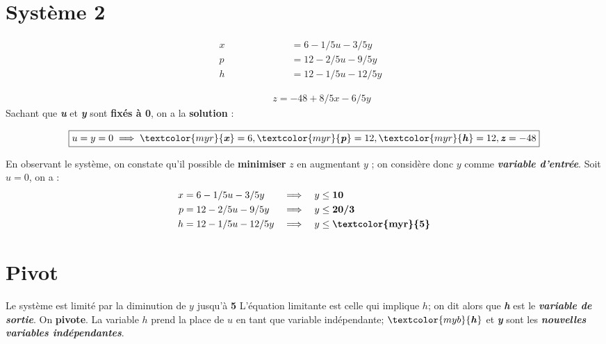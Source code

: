 \documentclass{report}
\newcommand{\Pointilles}[1]{%
  \par\nobreak
  \noindent\rule{0pt}{1.5\baselineskip}%
  \multido{}{#1}{\noindent\makebox[\linewidth]{\dotfill}\endgraf}%
  \bigskip%
}
\begin{document}
\begin{multicols*}{3}
\section{Système 2}
\begin{align*}
    x \quad\quad\quad\quad\quad\quad &= 6 - 1/5u -3/5y& \\
    p \quad\quad\quad\quad  &= 12 -2/5u -9/5y& \\
    h \quad\quad &= 12 - 1/5u -12/5y&
\end{align*}
\vspace{-2.5em}    
\Pointilles{1}
\vspace{-2.5em}
\begin{align*}
    \quad\quad\quad\;\; z = -48 +8/5x -6/5y
\end{align*}
Sachant que 
\textcolor{myb}{\textbf{\textit{u}}} et 
\textcolor{myb}{\textbf{\textit{y}}}  sont \textbf{fixés à 0}, 
on a la \textbf{solution} : 

\begin{align*}
\boxed{u = y = 0 \implies 
\textcolor{myr}{\textbf{\textit{x}}}  = 6, 
\textcolor{myr}{\textbf{\textit{p}}} = 12,
\textcolor{myr}{\textbf{\textit{h}}} = 12,
\textbf{\textit{z}} = -48}
\end{align*}

En observant le système, on constate qu'il possible de 
\textbf{minimiser} $z$ en augmentant $y$ ; on considère 
donc $y$ comme \textcolor{myb}{\textbf{\textit{variable d'entrée}}}. Soit 
$u = 0$, on a :
\begin{align*}
    x &= 6 - 1/5u -3/5y& 
    \implies \quad 
    & y \leq \textbf{10}  
    \\
    p &= 12 - 2/5u -9/5y 
      & \implies \quad  &  y \leq \textbf{20/3}
    \\
    h &= 12 - 1/5u -12/5y&
    \implies \quad & y \leq \textbf{\textcolor{myr}{5}} 
\end{align*}

\section{Pivot}
Le système est limité par la diminution de $y$ jusqu'à \textcolor{myr}{\textbf{5}} 
L'équation limitante est celle qui implique $h$; on dit alors que 
\textcolor{myr}{\textbf{\textit{h}}} est le 
\textcolor{myr}{\textbf{\textit{variable de sortie}}}. On 
\textbf{pivote}. La variable $h$ prend la place de $u$ en tant que
variable indépendante;
$\textcolor{myb}{\textbf{\textit{h}}}$ et  
\textcolor{myb}{\textbf{\textit{y}}} sont les 
\textcolor{myb}{\textbf{\textit{nouvelles variables indépendantes}}}.   


\end{multicols*}
\end{document}

